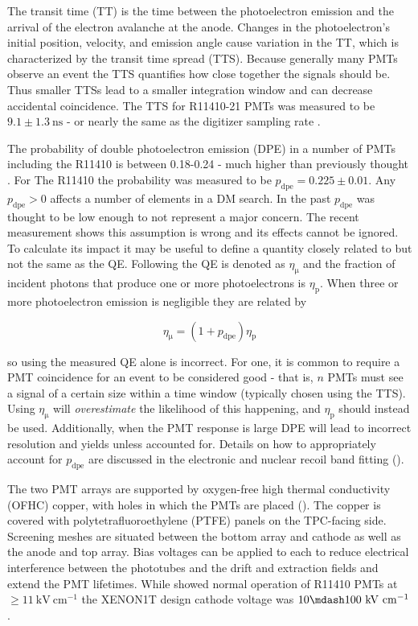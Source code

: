 The transit time (TT) is the time between the photoelectron emission and the arrival of the electron avalanche at the anode.  Changes in
the photoelectron's initial position, velocity, and emission angle cause variation in the TT, which is characterized by the
transit time spread (TTS).  Because generally many PMTs observe an event the TTS quantifies how close together the signals should
be.  Thus
smaller TTSs lead to a smaller integration window and can decrease accidental coincidence.  The TTS for R11410-21 PMTs was measured to be
$9.1 \pm 1.3\ \mathrm{ns}$ - or nearly the same as the digitizer sampling rate .

The probability of double photoelectron emission (DPE) in a number of PMTs including the R11410 is between 0.18-0.24 - much higher
than previously thought .  For The R11410 the probability was measured to be
$p_{\mathrm{dpe}} = 0.225 \pm 0.01$.  Any $p_{\mathrm{dpe}} > 0$ affects a number of elements in a DM
search.  In the past $p_{\mathrm{dpe}}$ was thought to be low enough to not represent a major concern.  The recent measurement shows this
assumption is wrong and its effects cannot be ignored.  To calculate its impact it may be useful to define a quantity closely
related to but not the same as the QE.  Following  the QE is denoted as $\eta_{\mathrm{\mu}}$ and the fraction of
incident photons that produce one or more photoelectrons is $\eta_{\mathrm{p}}$.  When three or more photoelectron emission is negligible
they are related by

\begin{equation}
\eta_{\mathrm{\mu}} = (1 + p_{\mathrm{dpe}}) \eta_{\mathrm{p}}
\label{eq:xenon1t_pmts_dpe}
\end{equation}

\noindent so using the measured QE alone is incorrect.  For one, it is common to require a PMT coincidence for an event to
be considered good - that is, $n$ PMTs must see a signal of a certain size within a time window (typically chosen using the TTS).  Using
$\eta_{\mathrm{\mu}}$ will
\textit{overestimate} the likelihood of this happening, and $\eta_{\mathrm{p}}$ should instead be used.  Additionally, when the PMT
response is large DPE will lead to incorrect resolution and yields unless accounted for.  Details on how to appropriately
account for $p_{\mathrm{dpe}}$ are discussed in the electronic and nuclear recoil band fitting
().

The two PMT arrays are supported by oxygen-free high thermal conductivity (OFHC) copper, with holes in which the PMTs are placed
().  The
copper is covered with polytetrafluoroethylene (PTFE) panels on the TPC-facing side.  Screening meshes are situated between the bottom
array and cathode as well as the anode and top array.  Bias voltages can be applied to each to reduce electrical interference between the
phototubes and the drift and extraction fields and extend the PMT lifetimes.  While  showed normal operation of R11410
PMTs at $\geq 11\ \mathrm{kV\ cm^{-1}}$ the XENON1T design cathode voltage was $10 \mdash 100\ \mathrm{kV\ cm^{-1}}$.

